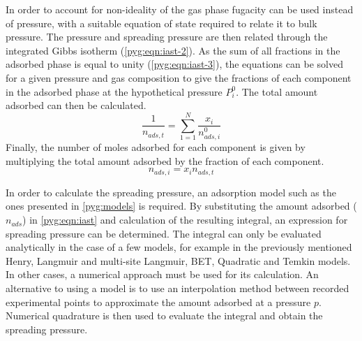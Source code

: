 In order to account for non-ideality of the gas phase
fugacity can be used instead of pressure,
with a suitable equation of state required to relate it to bulk pressure.
The pressure and spreading pressure are then related through
the integrated Gibbs isotherm (\autoref{pyg:eqn:iast-2}). As the sum of all
fractions in the adsorbed phase is equal to unity (\autoref{pyg:eqn:iast-3}),
the equations can be solved for a given pressure and gas composition to give
the fractions of each component in the adsorbed phase at the hypothetical
pressure \(P_{i}^{0}\). The total amount adsorbed can then be calculated.
%
\begin{equation}
	\frac{1}{n_{ads,t}} = \sum_{1=1}^{N} \frac{x_i}{n_{ads,i}^0}
\end{equation}
%
Finally, the number of moles adsorbed for each component is given
by multiplying the total amount adsorbed by the fraction of each
component.
%
\begin{equation}
	n_{ads, i} = x_i n_{ads,t}
\end{equation}

In order to calculate the spreading pressure, an adsorption model
such as the ones presented in \autoref{pyg:models} is required.
By substituting the amount adsorbed (\(n_{ads}\)) in \autoref{pyg:eqn:iast}
and calculation of the resulting integral, an expression for
spreading pressure can be determined. The integral can only be
evaluated analytically in the case of a few models, for example in
the previously mentioned Henry, Langmuir and multi-site Langmuir,
\gls{BET}, Quadratic and Temkin models. In other cases, a numerical approach
must be used for its calculation. An alternative to using a
model is to use an interpolation method between recorded experimental
points to approximate the amount adsorbed at a pressure \(p\). Numerical
quadrature is then used to evaluate the integral and obtain the
spreading pressure.